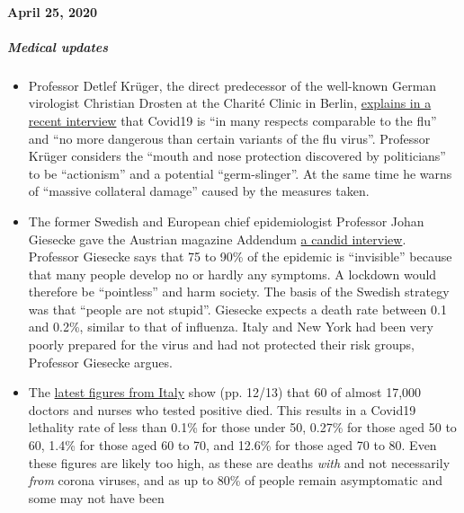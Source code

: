 \hypertarget{april-25-2020}{%
\paragraph{April 25, 2020}\label{april-25-2020}}

\hypertarget{medical-updates}{%
\subparagraph{\texorpdfstring{\textbf{Medical
updates}}{Medical updates}}\label{medical-updates}}

\begin{itemize}
\tightlist
\item
  Professor Detlef Krüger, the direct predecessor of the well-known
  German virologist Christian Drosten at the Charité Clinic in Berlin,
  \href{https://de.sputniknews.com/interviews/20200425326953541-corona-gefahr-virologe/}{explains
  in a recent interview} that Covid19 is ``in many respects comparable
  to the flu'' and ``no more dangerous than certain variants of the flu
  virus''. Professor Krüger considers the ``mouth and nose protection
  discovered by politicians'' to be ``actionism'' and a potential
  ``germ-slinger''. At the same time he warns of ``massive collateral
  damage'' caused by the measures taken.
\item
  The former Swedish and European chief epidemiologist Professor Johan
  Giesecke gave the Austrian magazine Addendum
  \href{https://www.addendum.org/coronavirus/interview-johan-giesecke/}{a
  candid interview}. Professor Giesecke says that 75 to 90\% of the
  epidemic is ``invisible'' because that many people develop no or
  hardly any symptoms. A lockdown would therefore be ``pointless'' and
  harm society. The basis of the Swedish strategy was that ``people are
  not stupid''. Giesecke expects a death rate between 0.1 and 0.2\%,
  similar to that of influenza. Italy and New York had been very poorly
  prepared for the virus and had not protected their risk groups,
  Professor Giesecke argues.
\item
  The
  \href{https://www.epicentro.iss.it/coronavirus/bollettino/Bollettino-sorveglianza-integrata-COVID-19_16-aprile-2020.pdf\#page=13}{latest
  figures from Italy} show (pp. 12/13) that 60 of almost 17,000 doctors
  and nurses who tested positive died. This results in a Covid19
  lethality rate of less than 0.1\% for those under 50, 0.27\% for those
  aged 50 to 60, 1.4\% for those aged 60 to 70, and 12.6\% for those
  aged 70 to 80. Even these figures are likely too high, as these are
  deaths \emph{with} and not necessarily \emph{from} corona viruses, and
  as up to 80\% of people remain asymptomatic and some may not have been

\end{itemize}
